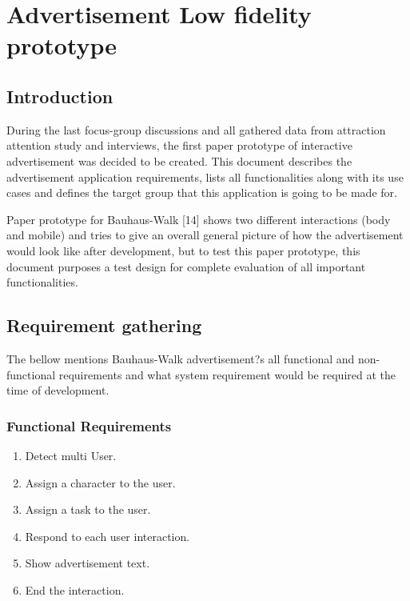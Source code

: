 \chapter{Advertisement Low fidelity prototype} %

\label{Chapter5} %

\section{Introduction}
During the last focus-group discussions and all gathered data from attraction attention study and interviews, the first paper prototype of interactive advertisement was decided to be created. This document describes the advertisement application requirements, lists all functionalities along with its use cases and defines the target group that this application is going to be made for. 

Paper prototype for Bauhaus-Walk [14] shows two different interactions (body and mobile) and tries to give an overall general picture of how the advertisement would look like after development, but to test this paper prototype, this document purposes a test design for complete evaluation of all important functionalities.


\section{Requirement gathering}

The bellow mentions Bauhaus-Walk advertisement?s all functional and non-functional requirements and what system requirement would be required at the time of development.

\subsection{Functional Requirements}

\begin{enumerate}
\item	Detect multi User.
\item	Assign a character to the user. 
\item	Assign a task to the user.
\item	Respond to each user interaction.
\item	Show advertisement text.
\item	End the interaction.
\end{enumerate}


